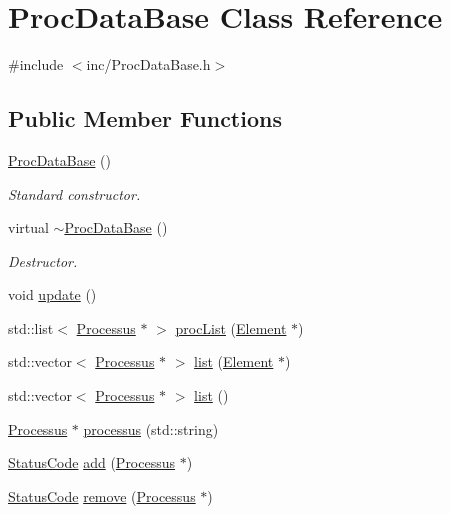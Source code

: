 \hypertarget{classProcDataBase}{
\section{ProcDataBase Class Reference}
\label{classProcDataBase}
}


{\ttfamily \#include $<$inc/ProcDataBase.h$>$}\subsection*{Public Member Functions}
\begin{DoxyCompactItemize}
\item 
\hyperlink{classProcDataBase_a82163dfca2df460ba2ea1559ffa72179}{ProcDataBase} ()
\begin{DoxyCompactList}\small\item\em Standard constructor. \item\end{DoxyCompactList}\item 
virtual \hyperlink{classProcDataBase_a65ec1212978a4996b5132bfaf1d0738d}{$\sim$ProcDataBase} ()
\begin{DoxyCompactList}\small\item\em Destructor. \item\end{DoxyCompactList}\item 
void \hyperlink{classProcDataBase_a604959db08c3871d863a799cc4e1d5f4}{update} ()
\item 
std::list$<$ \hyperlink{classProcessus}{Processus} $\ast$ $>$ \hyperlink{classProcDataBase_a8145de34e9857f3f6eebd2572740f198}{procList} (\hyperlink{classElement}{Element} $\ast$)
\item 
std::vector$<$ \hyperlink{classProcessus}{Processus} $\ast$ $>$ \hyperlink{classProcDataBase_a6f17bfad64929fa887c6aafb0080354b}{list} (\hyperlink{classElement}{Element} $\ast$)
\item 
std::vector$<$ \hyperlink{classProcessus}{Processus} $\ast$ $>$ \hyperlink{classProcDataBase_a813dbc8f9e7c4d69074a01394f04fc98}{list} ()
\item 
\hyperlink{classProcessus}{Processus} $\ast$ \hyperlink{classProcDataBase_a839b15c7bc0d73f5ff0f2516c3cb418e}{processus} (std::string)
\item 
\hyperlink{classStatusCode}{StatusCode} \hyperlink{classProcDataBase_a0aafeb65a41b92a6d1fdd67f363ef826}{add} (\hyperlink{classProcessus}{Processus} $\ast$)
\item 
\hyperlink{classStatusCode}{StatusCode} \hyperlink{classProcDataBase_a0413976bac8f233b31eab6d7a83866b9}{remove} (\hyperlink{classProcessus}{Processus} $\ast$)
\end{DoxyCompactItemize}
